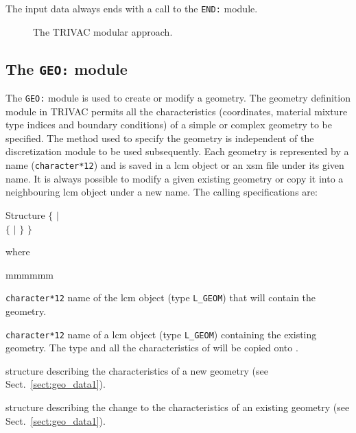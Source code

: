 \vskip 0.2cm

The input data always ends with a call to the {\tt END:} module.

\begin{figure}[htbp]
\begin{center} 
\epsfxsize=16cm
\centerline{ }
\parbox{14cm}{\caption{The TRIVAC modular approach.}
\label{fig:trivac3}} 
\end{center} 
\end{figure}

\subsection{The {\tt GEO:} module}

The {\tt GEO:} module is used to create or modify a geometry. The geometry definition module in TRIVAC permits all the characteristics (coordinates, material mixture type indices and boundary conditions) of a simple or complex geometry to be specified. The method used to specify the geometry is independent of the discretization module to be used subsequently. Each geometry is represented by a name ({\tt character*12}) and is saved in a {\sc lcm} object or an {\sc xsm} file under its given name. It is always possible to modify a given existing geometry or copy it into a neighbouring {\sc lcm} object under a new name. The calling specifications are:

\begin{DataStructure}{Structure }
$\{$  \moc{:=}   $|$ \\
 \moc{:=}  $\{$  $|$  $\}$ \moc{::}  $\}$
\end{DataStructure}

\noindent

\noindent where
\begin{ListeDeDescription}{mmmmmm}

\item[\dusa{GEOM1}] {\tt character*12} name of the {\sc lcm} object (type {\tt L\_GEOM}) that will contain the geometry.

\item[\dusa{GEOM2}] {\tt character*12} name of a {\sc lcm} object (type {\tt L\_GEOM}) containing the existing geometry. The type and all the characteristics of  will be copied onto .

\item[\dstr{geo\_data1}] structure describing the characteristics of a new geometry (see Sect.~\ref{sect:geo_data1}).

\item[\dstr{geo\_data2}] structure describing the change to the characteristics of an existing geometry (see Sect.~\ref{sect:geo_data1}).

\end{ListeDeDescription}

